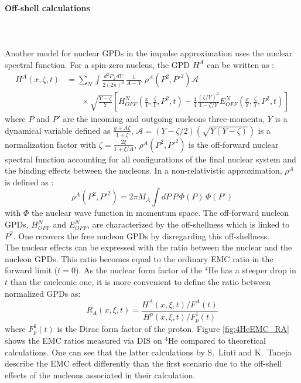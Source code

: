 \paragraph{Off-shell calculations}
~\\
~\\ 
Another model for nuclear GPDs in the impulse approximation uses the nuclear spectral function. For a spin-zero nucleus, the GPD $H^{A}$ can be written as \cite{EMC_simonetta}:
\begin{align}
H^{A}(x, \zeta, t) &= \sum_{N} \int \frac{d^{2}P_{\perp} dY}{2(2\pi)^3} \, 
   \frac{1}{A-Y}\,  \, \rho^{A}(P^2, P'^2) \mathcal{A}\\ \nonumber
& ~~~~~~~~ \times \sqrt{\frac{Y-\zeta}{Y}} \left[H^{N}_{OFF}(\frac{x}{Y}, 
\frac{\zeta}{Y},P^2, t) - \frac{1}{4} \frac{(\zeta/Y)^2}{1-\zeta/Y } 
E^{N}_{OFF}(\frac{x}{Y}, \frac{\zeta}{Y},P^2, t) \right]
\label{eq:simonetta}
\end{align}
where $P$ and $P'$ are the incoming and outgoing nucleons three-momenta, $Y$ is 
a dynamical variable defined as $\frac{y+A\zeta}{1+\zeta}$, $\mathcal{A} = 
(Y-\zeta/2)(\sqrt{Y(Y-\zeta)})$ is a normalization factor with $\zeta = 
\frac{2\xi}{1+\xi/A}$, $\rho^{A}(P^2, P'^2)$ is the off-forward nuclear 
spectral function accounting for all configurations of the final nuclear system 
and the binding effects between the nucleons. In a non-relativistic 
approximation, $\rho^{A}$ is defined as \cite{simonetta_2}:
\begin{equation}
\rho^{A}(P^2, P'^2) = 2\pi M_A \int dP\,P\,\Phi(P)\,\Phi(P') 
\end{equation}
with $\Phi$ the nuclear wave function in momentum space. The off-forward nucleon GPDs, $H^{N}_{OFF}$ and $E^{N}_{OFF}$, are characterized by the off-shellness which is linked to $P^2$. One recovers the free nucleon GPDs by disregarding this off-shellness.\\  

The nuclear effects can be expressed with the ratio between the nuclear and the nucleon GPDs. This ratio becomes equal to the ordinary EMC ratio in the forward limit ($t = 0$). As the nuclear form factor of the $^4$He has a steeper drop in $t$ than the nucleonic one, it is more convenient to define the ratio between normalized GPDs as:
\begin{equation}
R_{A}(x, \xi,t) = \frac{H^{A}(x, \xi, t)/F^{A}(t)}{H^{p}(x, \xi, t)/F^{1}_{p}(t)}
\end{equation}
where $F^{1}_{p}(t)$ is the Dirac form factor of the proton. Figure \ref{fig:4HeEMC_RA} shows the EMC ratios measured via DIS on $^4$He compared to theoretical calculations. One can see that the latter calculations by S.~Liuti and K.~Taneja describe the EMC effect differently than the first scenario due to the off-shell effects of the nucleons associated in their calculation.\\ 

